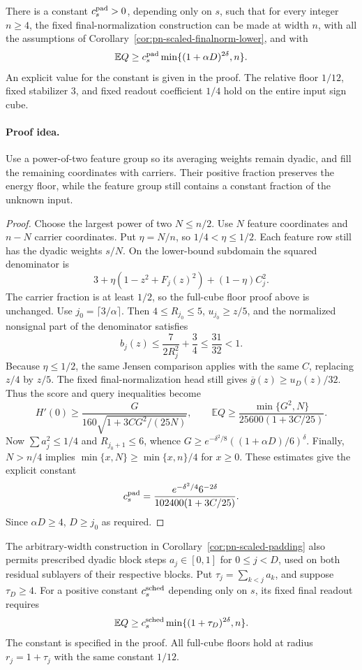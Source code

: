 \begin{corollary}
\label{cor:pn-scaled-padding}
There is a constant $c_s^{\rm pad}>0$, depending only on $s$, such
that for every integer $n\ge4$, the fixed final-normalization construction
can be made at width $n$, with all the assumptions of
Corollary~\ref{cor:pn-scaled-finalnorm-lower}, and with
\[
 \mathbb E Q\ge
 c_s^{\rm pad}
 \min\{(1+\alpha D)^{2\delta},n\}.
\]
An explicit value for the constant is given in the proof.
The relative floor $1/12$, fixed stabilizer $3$, and fixed readout
coefficient $1/4$ hold on the entire input sign cube.
\end{corollary}
\paragraph{Proof idea.}
Use a power-of-two feature group so its averaging weights remain
dyadic, and fill the remaining coordinates with carriers. Their positive
fraction preserves the energy floor, while the feature group still contains
a constant fraction of the unknown input.

\begin{proof}
Choose the largest power of two $N\le n/2$. Use $N$ feature
coordinates and $n-N$ carrier coordinates. Put $\eta=N/n$, so
$1/4<\eta\le1/2$. Each feature row still has the dyadic weights
$s/N$. On the lower-bound subdomain the squared denominator is
\[
 3+\eta(1-z^2+F_j(z)^2)+(1-\eta)C_j^2.
\]
The carrier fraction is at least $1/2$, so the full-cube floor proof
above is unchanged. Use $j_0=\lceil3/\alpha\rceil$. Then
$4\le R_{j_0}\le5$, $u_{j_0}\ge z/5$, and the normalized nonsignal
part of the denominator satisfies
\[
 b_j(z)\le\frac{7}{2R_j^2}+\frac34\le\frac{31}{32}<1.
\]
Because $\eta\le1/2$, the same Jensen comparison applies with the
same $C$, replacing $z/4$ by $z/5$. The fixed final-normalization
head still gives $\overline g(z)\ge u_D(z)/32$. Thus the score and
query inequalities become
\[
 H'(0)\ge\frac{G}{160\sqrt{1+3CG^2/(25N)}},\qquad
 \mathbb E Q\ge\frac{\min\{G^2,N\}}{25600(1+3C/25)}.
\]
Now $\sum a_j^2\le1/4$ and $R_{j_0+1}\le6$, whence
$G\ge e^{-\delta^2/8}((1+\alpha D)/6)^\delta$.
Finally, $N>n/4$ implies
$\min\{x,N\}\ge\min\{x,n\}/4$ for $x\ge0$. These estimates
give the explicit constant
\[
 c_s^{\rm pad}=\frac{e^{-\delta^2/4}6^{-2\delta}}
                         {102400(1+3C/25)}.
\]
Since $\alpha D\ge4$,
$D\ge j_0$ as required.
\end{proof}

\begin{corollary}
\label{cor:pn-scheduled-lower}
The arbitrary-width construction in Corollary~\ref{cor:pn-scaled-padding}
also permits prescribed dyadic block steps $a_j\in[0,1]$ for $0\le j<D$,
used on both residual sublayers of their respective blocks. Put
$\tau_j=\sum_{k<j}a_k$, and suppose $\tau_D\ge4$.
For a positive constant $c_s^{\rm sched}$ depending only on $s$,
its fixed final readout requires
\[
 \mathbb E Q\ge
 c_s^{\rm sched}
 \min\{(1+\tau_D)^{2\delta},n\}.
\]
The constant is specified in the proof.
All full-cube floors hold at radius $r_j=1+\tau_j$ with the same
constant $1/12$.
\end{corollary}
